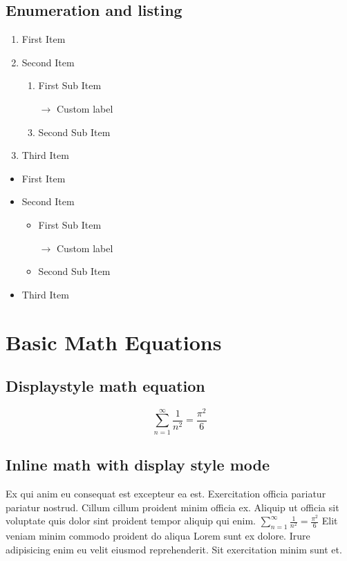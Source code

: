 \documentclass[12pt]{article}
\begin{document}
\subsection{Enumeration and listing}

\begin{enumerate}[label=\arabic*]
    \item First Item
    \item Second Item
    \begin{enumerate}[label=\arabic*]
        \item First Sub Item
        \item[$\rightarrow$] Custom label
        \item Second Sub Item
    \end{enumerate}
    \item Third Item
\end{enumerate}

\begin{itemize}
    \item First Item
    \item Second Item
    \begin{itemize}
        \item First Sub Item
        \item[$\rightarrow$] Custom label
        \item Second Sub Item
    \end{itemize}
    \item Third Item
\end{itemize}

\section{Basic Math Equations}

\subsection{Displaystyle math equation}

\begin{equation} %
    \sum_{n=1}^\infty \frac{1}{n^2} = \frac{\pi^2}{6}
\end{equation}

\subsection{Inline math with display style mode}

Ex qui anim eu consequat est excepteur ea est. Exercitation officia pariatur pariatur nostrud. Cillum cillum proident minim officia ex. Aliquip ut officia sit voluptate quis dolor sint proident tempor aliquip qui enim. $ \displaystyle \sum_{n=1}^\infty \frac{1}{n^2} = \frac{\pi^2}{6} $ Elit veniam minim commodo proident do aliqua Lorem sunt ex dolore. Irure adipisicing enim eu velit eiusmod reprehenderit. Sit exercitation minim sunt et.
\end{document}
